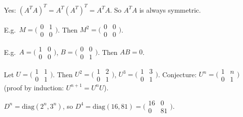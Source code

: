 \begin{solutions}
    \item Yes: $(A^{T} A)^{T} = A^{T} (A^{T})^{T} = A^{T} A$. So $A^{T} A$ is always symmetric.

    \item E.g.\ $M = \bigl(\begin{smallmatrix} 0 & 1 \\ 0 & 0 \end{smallmatrix}\bigr)$. Then $M^{2} = \bigl(\begin{smallmatrix} 0 & 0 \\ 0 & 0 \end{smallmatrix}\bigr)$.

    \item E.g.\ $A = \bigl(\begin{smallmatrix} 1 & 0 \\ 0 & 0 \end{smallmatrix}\bigr)$, $B = \bigl(\begin{smallmatrix} 0 & 0 \\ 0 & 1 \end{smallmatrix}\bigr)$. Then $A B = 0$.

    \item Let $U = \bigl(\begin{smallmatrix} 1 & 1 \\ 0 & 1 \end{smallmatrix}\bigr)$. Then $U^{2} = \bigl(\begin{smallmatrix} 1 & 2 \\ 0 & 1 \end{smallmatrix}\bigr)$, $U^{3} = \bigl(\begin{smallmatrix} 1 & 3 \\ 0 & 1 \end{smallmatrix}\bigr)$. Conjecture: $U^{n} = \bigl(\begin{smallmatrix} 1 & n \\ 0 & 1 \end{smallmatrix}\bigr)$ (proof by induction: $U^{n+1} = U^{n} U$).

    \item $D^{n} = \mathrm{diag}(2^{n}, 3^{n})$, so $D^{4} = \mathrm{diag}(16, 81) = \bigl(\begin{smallmatrix} 16 & 0 \\ 0 & 81 \end{smallmatrix}\bigr)$.


\end{solutions}
